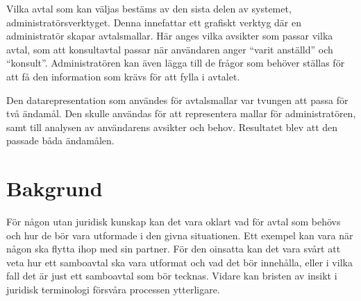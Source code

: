 \documentclass[a4paper,12pt]{article}
\begin{document}
Vilka avtal som kan väljas bestäms av den sista delen av systemet, administratör\-sverktyget. Denna innefattar ett grafiskt verktyg där en administratör skapar avtalsmallar. Här anges vilka avsikter som passar vilka avtal, som att konsultavtal passar när användaren anger ``varit anställd'' och ``konsult''. Administratören kan även lägga till de frågor som behöver ställas för att få den information som krävs för att fylla i avtalet. 

Den datarepresentation som användes för avtalsmallar var tvungen att passa för två ändamål. Den skulle användas för att representera mallar för administratören, samt till analysen av användarens avsikter och behov. Resultatet blev att den passade båda ändamålen.






\section{Bakgrund}

För någon utan juridisk kunskap kan det vara oklart vad för avtal som behövs och hur de bör vara utformade i den givna situationen. Ett exempel kan vara när någon ska flytta ihop med sin partner. För den oinsatta kan det vara svårt att veta hur ett samboavtal ska vara utformat och vad det bör innehålla, eller i vilka fall det är just ett samboavtal som bör tecknas. Vidare kan bristen av insikt i juridisk terminologi försvåra processen ytterligare.
\end{document}
